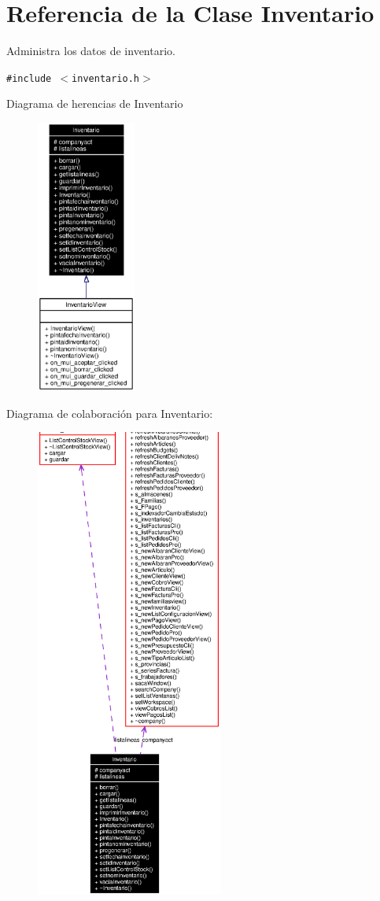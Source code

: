 \section{Referencia de la Clase Inventario}
\label{classInventario}
Administra los datos de inventario.  


{\tt \#include $<$inventario.h$>$}

Diagrama de herencias de Inventario\begin{figure}[H]
\begin{center}
\leavevmode
\includegraphics[width=92pt]{classInventario__inherit__graph}
\end{center}
\end{figure}
Diagrama de colaboraci\'{o}n para Inventario:\begin{figure}[H]
\begin{center}
\leavevmode
\includegraphics[width=174pt]{classInventario__coll__graph}
\end{center}
\end{figure}
